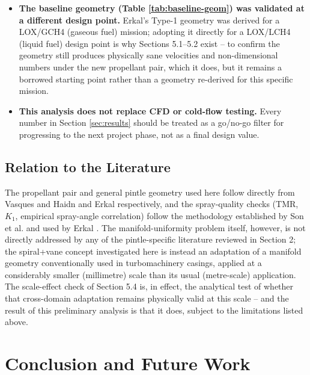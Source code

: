 \documentclass[11pt,a4paper]{article}
\begin{document}
\begin{itemize}[leftmargin=1.5em]
\item \textbf{The baseline geometry (Table \ref{tab:baseline-geom}) was validated at a different design point.} Erkal's Type-1 geometry \cite{erkal2019} was derived for a LOX/GCH4 (gaseous fuel) mission; adopting it directly for a LOX/LCH4 (liquid fuel) design point is why Sections 5.1--5.2 exist -- to confirm the geometry still produces physically sane velocities and non-dimensional numbers under the new propellant pair, which it does, but it remains a borrowed starting point rather than a geometry re-derived for this specific mission.
\item \textbf{This analysis does not replace CFD or cold-flow testing.} Every number in Section \ref{sec:results} should be treated as a go/no-go filter for progressing to the next project phase, not as a final design value.
\end{itemize}

\subsection{Relation to the Literature}

The propellant pair and general pintle geometry used here follow directly from Vasques and Haidn \cite{vasques2017} and Erkal \cite{erkal2019} respectively, and the spray-quality checks (TMR, $K_1$, empirical spray-angle correlation) follow the methodology established by Son et al. \cite{son2017} and used by Erkal \cite{erkal2019}. The manifold-uniformity problem itself, however, is not directly addressed by any of the pintle-specific literature reviewed in Section 2; the spiral+vane concept investigated here is instead an adaptation of a manifold geometry conventionally used in turbomachinery casings, applied at a considerably smaller (millimetre) scale than its usual (metre-scale) application. The scale-effect check of Section 5.4 is, in effect, the analytical test of whether that cross-domain adaptation remains physically valid at this scale -- and the result of this preliminary analysis is that it does, subject to the limitations listed above.

\section{Conclusion and Future Work}
\label{sec:conclusion}
\end{document}
